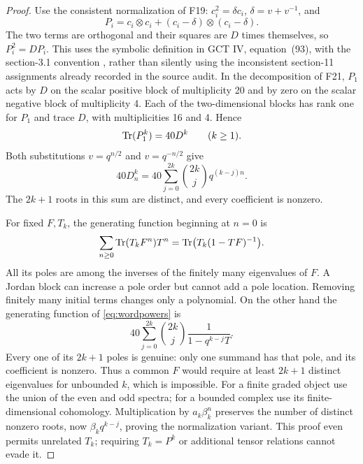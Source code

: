 \documentclass[11pt,a4paper]{article}
\renewcommand{\S}{\ensuremath{\mathsection}}
\newcommand{\fid}[1]{\textsf{#1}}\newcommand{\gate}[1]{\textsf{#1}}
\theoremstyle{named}\newtheorem{finding}{Finding}[section]
\theoremstyle{definition}\newtheorem{definition}[finding]{Definition}
\theoremstyle{remark}\newtheorem{remark}[finding]{Remark}
\begin{document}
\begin{proof}
Use the consistent normalization of \fid{F19}: $c_i^2=\delta c_i$,
$\delta=v+v^{-1}$, and
\[
 P_i=c_i\otimes c_i+(c_i-\delta)\otimes(c_i-\delta).
\]
The two terms are orthogonal and their squares are $D$ times
themselves, so $P_i^2=DP_i$. This uses the symbolic definition
in GCT IV, equation~(93), with the section-3.1 convention
\cite[\S3.1 and Definition~11.1, equation~(93)]{IV},
rather than silently using the inconsistent section-11
assignments already recorded in the source audit.
In the decomposition of \fid{F21}, $P_1$ acts by $D$ on
the scalar positive block of multiplicity 20 and by zero on
the scalar negative block of multiplicity 4. Each of the
two-dimensional blocks has rank one for $P_1$ and trace $D$,
with multiplicities 16 and 4. Hence
\[
 \operatorname{Tr}(P_1^k)=40D^k\qquad(k\ge1).
\]
Both substitutions $v=q^{n/2}$ and $v=q^{-n/2}$ give
\begin{equation}\label{eq:wordpowers}
 40D_n^k
   =40\sum_{j=0}^{2k}\binom{2k}{j}q^{(k-j)n}.
\end{equation}
The $2k+1$ roots in this sum are distinct, and every coefficient
is nonzero.

For fixed $F,T_k$, the generating function beginning at $n=0$ is
\[
 \sum_{n\ge0}\operatorname{Tr}(T_kF^n)T^n
   =\operatorname{Tr}\bigl(T_k(1-TF)^{-1}\bigr).
\]
All its poles are among the inverses of the finitely many
eigenvalues of $F$. A Jordan block can increase a pole order
but cannot add a pole location. Removing finitely many initial
terms changes only a polynomial. On the other hand the
generating function of \eqref{eq:wordpowers} is
\[
 40\sum_{j=0}^{2k}\binom{2k}{j}
      \frac{1}{1-q^{k-j}T}.
\]
Every one of its $2k+1$ poles is genuine: only one summand has
that pole, and its coefficient is nonzero. Thus a common $F$
would require at least $2k+1$ distinct eigenvalues for unbounded
$k$, which is impossible.
For a finite graded object use the union of the even and odd
spectra; for a bounded complex use its finite-dimensional
cohomology. Multiplication by $a_k\beta_k^n$ preserves the
number of distinct nonzero roots, now
$\beta_kq^{k-j}$, proving the normalization variant.
This proof even permits unrelated $T_k$; requiring
$T_k=P^k$ or additional tensor relations cannot evade it.


\end{proof}
\end{document}
